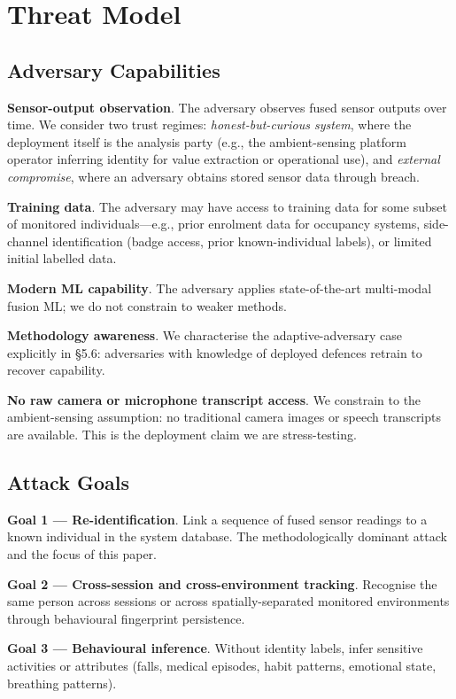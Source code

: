 \documentclass[sigconf,nonacm]{acmart}
\begin{document}
\section{Threat Model}

\subsection{Adversary Capabilities}

\textbf{Sensor-output observation}. The adversary observes
fused sensor outputs over time. We consider two trust regimes:
\emph{honest-but-curious system}, where the deployment itself
is the analysis party (e.g., the ambient-sensing platform
operator inferring identity for value extraction or
operational use), and \emph{external compromise}, where an
adversary obtains stored sensor data through breach.

\textbf{Training data}. The adversary may have access to
training data for some subset of monitored individuals---e.g.,
prior enrolment data for occupancy systems, side-channel
identification (badge access, prior known-individual labels), or
limited initial labelled data.

\textbf{Modern ML capability}. The adversary applies
state-of-the-art multi-modal fusion ML; we do not constrain to
weaker methods.

\textbf{Methodology awareness}. We characterise the
adaptive-adversary case explicitly in §5.6: adversaries with
knowledge of deployed defences retrain to recover capability.

\textbf{No raw camera or microphone transcript access}. We
constrain to the ambient-sensing assumption: no traditional
camera images or speech transcripts are available. This is the
deployment claim we are stress-testing.

\subsection{Attack Goals}

\textbf{Goal 1 --- Re-identification}. Link a sequence of fused
sensor readings to a known individual in the system database.
The methodologically dominant attack and the focus of this
paper.

\textbf{Goal 2 --- Cross-session and cross-environment
tracking}. Recognise the same person across sessions or across
spatially-separated monitored environments through behavioural
fingerprint persistence.

\textbf{Goal 3 --- Behavioural inference}. Without identity
labels, infer sensitive activities or attributes (falls,
medical episodes, habit patterns, emotional state, breathing
patterns).
\end{document}
